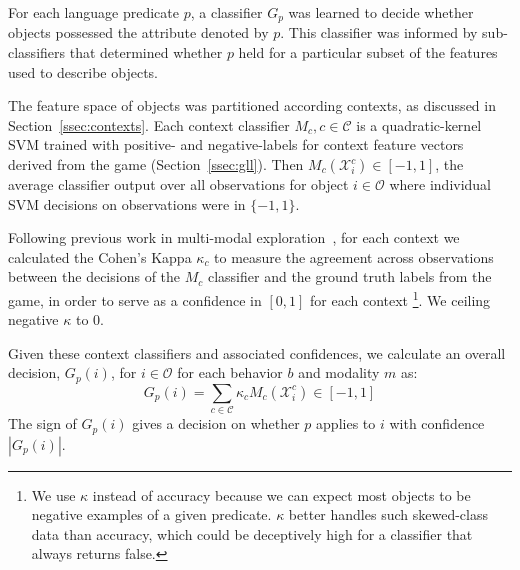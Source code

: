 For each language predicate $p$, a classifier $G_p$ was learned to decide whether objects possessed the attribute denoted by $p$.
This classifier was informed by sub-classifiers that determined whether $p$ held for a particular subset of the features used to describe objects.

The feature space of objects was partitioned according contexts, as discussed in Section~\ref{ssec:contexts}.
Each context classifier $M_{c}, c\in\mathcal{C}$ is a quadratic-kernel SVM trained with positive- and negative-labels for context feature vectors derived from the \ispy game (Section~\ref{ssec:gll}).
Then $M_{c}(\mathcal{X}_i^c)\in [-1,1]$, the average classifier output over all observations for object $i\in\mathcal{O}$ where individual SVM decisions on observations were in $\{-1,1\}$.

Following previous work in multi-modal exploration~\cite{sinapov:icra14}, for each context we calculated the Cohen's Kappa $\kappa_{c}$ to measure the agreement across observations between the decisions of the $M_{c}$ classifier and the ground truth labels from the \ispy game, in order to serve as a confidence in $[0,1]$ for each context
\footnote{We use $\kappa$ instead of accuracy because we can expect most objects to be negative examples of a given predicate. $\kappa$ better handles such skewed-class data than accuracy, which could be deceptively high for a classifier that always returns false.}.
We ceiling negative $\kappa$ to $0$.

Given these context classifiers and associated confidences, we calculate an overall decision, $G_p(i)$, for $i\in\mathcal{O}$ for each behavior $b$ and modality $m$ as:
\begin{equation}
	G_p(i) = \sum_{c\in\mathcal{C}}{\kappa_{c} M_{c}(\mathcal{X}_i^c)} \in [-1,1]
\end{equation}
The sign of $G_p(i)$ gives a decision on whether $p$ applies to $i$ with confidence $|G_p(i)|$.
